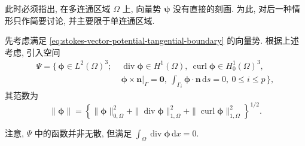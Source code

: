 此时必须指出, 在多连通区域 $\Omega$ 上,
向量势 $\boldsymbol{\psi}$ 没有直接的刻画.
为此, 对后一种情形只作简要讨论, 并主要限于单连通区域.

先考虑满足
\eqref{eq:stokes-vector-potential-tangential-boundary} 的向量势.
根据上述考虑, 引入空间
\[
\begin{aligned}
\Psi=\{\,\boldsymbol{\phi}\in L^2(\Omega)^3;\;&
\operatorname{div}\boldsymbol{\phi}\in H^1(\Omega),\
\operatorname{curl}\boldsymbol{\phi}\in H_0^1(\Omega)^3,\\
&\boldsymbol{\phi}\times\mathbf{n}|_\Gamma=\mathbf{0},\
\int_{\Gamma_i}\boldsymbol{\phi}\cdot\mathbf{n}\,\mathrm{d}s=0,\
0\le i\le p\,\},
\end{aligned}
\]
其范数为
\[
\|\boldsymbol{\phi}\|
=
\left\{
\|\boldsymbol{\phi}\|_{0,\Omega}^2
+\|\operatorname{div}\boldsymbol{\phi}\|_{1,\Omega}^2
+\|\operatorname{curl}\boldsymbol{\phi}\|_{1,\Omega}^2
\right\}^{1/2}.
\]

注意, $\Psi$ 中的函数并非无散, 但满足
$\int_\Omega\operatorname{div}\boldsymbol{\phi}\,\mathrm{d}x=0$.

